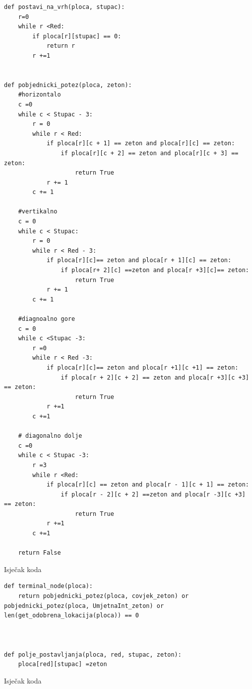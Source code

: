 \documentclass[]{foi}
\begin{document}
\begin{listing}
    \begin{verbatim}
def postavi_na_vrh(ploca, stupac):
    r=0
    while r <Red:
        if ploca[r][stupac] == 0:
            return r
        r +=1


def pobjednicki_potez(ploca, zeton):
    #horizontalo
    c =0
    while c < Stupac - 3:
        r = 0
        while r < Red:
            if ploca[r][c + 1] == zeton and ploca[r][c] == zeton:
                if ploca[r][c + 2] == zeton and ploca[r][c + 3] == zeton:
                    return True
            r += 1
        c += 1

    #vertikalno
    c = 0
    while c < Stupac:
        r = 0
        while r < Red - 3:
            if ploca[r][c]== zeton and ploca[r + 1][c] == zeton:
                if ploca[r+ 2][c] ==zeton and ploca[r +3][c]== zeton:
                    return True
            r += 1
        c += 1

    #diagnoalno gore
    c = 0
    while c <Stupac -3:
        r =0
        while r < Red -3:
            if ploca[r][c]== zeton and ploca[r +1][c +1] == zeton:
                if ploca[r + 2][c + 2] == zeton and ploca[r +3][c +3] == zeton:
                    return True
            r +=1
        c +=1

    # diagonalno dolje
    c =0
    while c < Stupac -3:
        r =3
        while r <Red:
            if ploca[r][c] == zeton and ploca[r - 1][c + 1] == zeton:
                if ploca[r - 2][c + 2] ==zeton and ploca[r -3][c +3] == zeton:
                    return True
            r +=1
        c +=1

    return False
    \end{verbatim}
    \caption{Isječak koda}
    \label{lst:dva}
\end{listing}


\begin{listing}
    \begin{verbatim}
def terminal_node(ploca):
    return pobjednicki_potez(ploca, covjek_zeton) or pobjednicki_potez(ploca, UmjetnaInt_zeton) or len(get_odobrena_lokacija(ploca)) == 0



def polje_postavljanja(ploca, red, stupac, zeton):
    ploca[red][stupac] =zeton

    \end{verbatim}
    \caption{Isječak koda}
    \label{lst:dva}
\end{listing}
\end{document}
